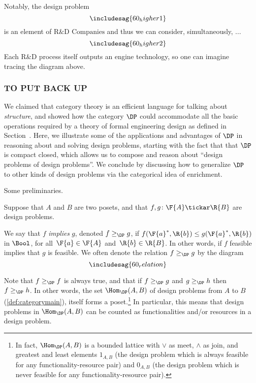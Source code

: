 Notably, the design problem
\[
\includesag{60_higher1}
\]
is an element of $\text{R\&D Companies}$ and thus we can consider, simultaneously, ...
\[
\includesag{60_higher2}
\]
Each R\&D process itself outputs an engine technology, so one can imagine tracing the diagram above.

\subsubsection*{TO PUT BACK UP}
We claimed that category theory is an efficient language for talking about \emph{structure}, and showed how the category $\DP$ could accommodate all the basic operations required by a theory of formal engineering design as defined in Section~\XXX. Here, we illustrate some of the applications and advantages of $\DP$ in reasoning about and solving design problems, starting with the fact that that $\DP$ is compact closed, which allows us to compose and reason about ``design problems of design problems''.  We conclude by discussing how to generalize $\DP$ to other kinds of design problems via the categorical idea of enrichment.

Some preliminaries.

\begin{definition}\label{def:DP_loc_pos}
%
Suppose that $A$ and $B$ are two posets, and that $f,g \colon \F{A} \tickar \R{B}$ are design problems.

We say that $f$ \emph{implies} $g$, denoted $f \geq_{\DP} g$, if $f(\F{a}^*,\R{b}) \leq g(\F{a}^*,\R{b} )$ in $\Bool$, for all~$\F{a} \in \F{A}$
and~$\R{b} \in \R{B}$. In other words, if $f$ feasible implies that $g$ is feasible. We often denote the relation $f \geq_{\DP} g$
by the diagram
\begin{equation}
\includesag{60_relation}
\end{equation}
\end{definition}

Note that $f\geq_\DP f$ is always true, and that if $f\geq_\DP g$ and $g\geq_\DP h$ then $f\geq_\DP h$.
In other words, the set $\Hom_\DP(A,B)$ of design problems from $A$ to $B$ (\cref{def:categorymain}), itself forms a poset.\footnote{In fact, $\Hom_\DP(A,B)$ is a bounded lattice with $\vee$ as meet, $\wedge$ as join, and greatest and least elements $1_{A,B}$ (the design problem which is always feasible for any
functionality-resource pair) and $0_{A,B}$ (the design problem which is never feasible for any functionality-resource pair).}
In particular, this means that design problems in $\Hom_\DP(A,B)$ can be counted as functionalities and/or resources in a design problem.

